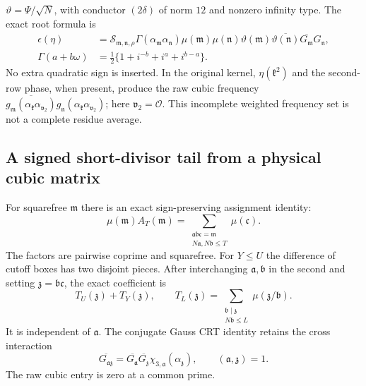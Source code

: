 $\vartheta=\Psi/\sqrt N$, with conductor $(2\delta)$ of norm $12$
and nonzero infinity type. The exact root formula is
\begin{equation}\label{gtl:root-cubic}
 \begin{aligned}
 \epsilon(\eta)
 &=\mathcal S_{\mathfrak m,\mathfrak n,\rho}
       \Gamma(\alpha_{\mathfrak m}\alpha_{\mathfrak n})
       \mu(\mathfrak m)\mu(\mathfrak n)
       \vartheta(\mathfrak m)\overline{\vartheta(\mathfrak n)}
       \overline{G_{\mathfrak m}}G_{\mathfrak n},\\
 \Gamma(a+b\omega)
 &=\tfrac12\{1+i^{-b}+i^a+i^{b-a}\}.
 \end{aligned}
\end{equation}
No extra quadratic sign is inserted. In the original kernel,
$\eta(\mathfrak k^2)$ and the second-row phase, when present,
produce the raw cubic frequency
$\overline{g_{\mathfrak m}(\alpha_{\mathfrak k}\alpha_{\mathfrak v_2})}
 g_{\mathfrak n}(\alpha_{\mathfrak k}\alpha_{\mathfrak v_2})$;
here $\mathfrak v_2=\mathcal O$. This incomplete weighted
frequency set is not a complete residue average.

\subsection{A signed short-divisor tail from a physical cubic matrix}
\label{gtl:tail}
For squarefree $\mathfrak m$ there is an exact sign-preserving
assignment identity:
\begin{equation}\label{gtl:ternary}
 \mu(\mathfrak m)A_T(\mathfrak m)
   =\sum_{\substack{\mathfrak a\mathfrak b\mathfrak c=\mathfrak m\\
                   N\mathfrak a,N\mathfrak b\le T}}
                                         \mu(\mathfrak c).
\end{equation}
The factors are pairwise coprime and squarefree. For $Y\le U$ the
difference of cutoff boxes has two disjoint pieces. After interchanging
$\mathfrak a,\mathfrak b$ in the second and setting
$\mathfrak z=\mathfrak b\mathfrak c$, the exact coefficient is
\begin{equation}\label{gtl:T-coefficient}
 T_U(\mathfrak z)+T_Y(\mathfrak z),\qquad
 T_L(\mathfrak z)=
       \sum_{\substack{\mathfrak b\mid\mathfrak z\\N\mathfrak b\le L}}
                                  \mu(\mathfrak z/\mathfrak b).
\end{equation}
It is independent of $\mathfrak a$. The conjugate Gauss CRT identity
retains the cross interaction
\begin{equation}\label{gtl:gauss-cross}
 \overline{G_{\mathfrak a\mathfrak z}}
  =\overline{G_{\mathfrak a}}\overline{G_{\mathfrak z}}
                 \chi_{3,\mathfrak a}(\alpha_{\mathfrak z}),
 \qquad(\mathfrak a,\mathfrak z)=1 .
\end{equation}
The raw cubic entry is zero at a common prime.

